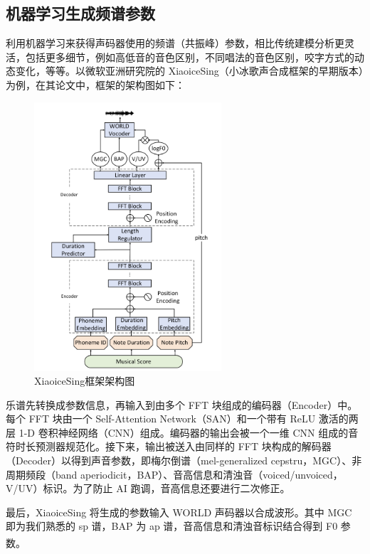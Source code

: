 \documentclass[12pt,a4paper]{ctexart}
\newcommand{\supercite}[1]{\textsuperscript{\cite{#1}}}
\begin{document}
\subsection{机器学习生成频谱参数}
利用机器学习来获得声码器使用的频谱（共振峰）参数，相比传统建模分析更灵活，包括更多细节，例如高低音的音色区别，不同唱法的音色区别，咬字方式的动态变化，等等。以微软亚洲研究院的 XiaoiceSing（小冰歌声合成框架的早期版本）为例，在其论文中，框架的架构图如下：
\begin{figure}[H]
    \centering
    \includegraphics[height=10cm]{figure3.png}
    \caption{XiaoiceSing框架架构图}
\end{figure}
乐谱先转换成参数信息，再输入到由多个 FFT 块组成的编码器（Encoder）中。每个 FFT 块由一个 Self-Attention Network（SAN）和一个带有 ReLU 激活的两层 1-D 卷积神经网络（CNN）组成。编码器的输出会被一个一维 CNN 组成的音符时长预测器规范化。接下来，输出被送入由同样的 FFT 块构成的解码器（Decoder）以得到声音参数，即梅尔倒谱（mel-generalized cepstru，MGC）、非周期频段（band aperiodicit，BAP）、音高信息和清浊音（voiced/unvoiced，V/UV）标识。为了防止 AI 跑调，音高信息还要进行二次修正。

最后，XiaoiceSing 将生成的参数输入 WORLD 声码器以合成波形。其中 MGC 即为我们熟悉的 sp 谱，BAP 为 ap 谱，音高信息和清浊音标识结合得到 F0 参数。\supercite{10}
\end{document}
